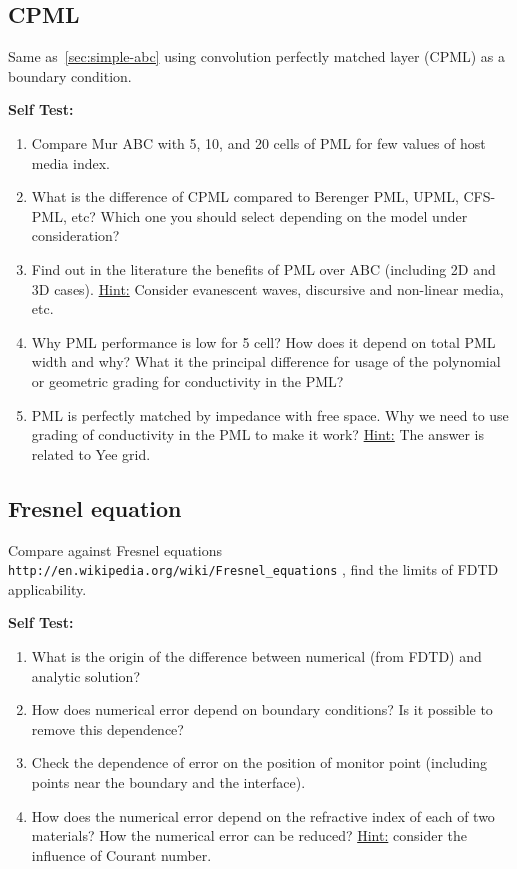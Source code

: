 \documentclass[11pt]{article}
\begin{document}
\subsection{CPML}
\label{sec:cpml}

Same as~\ref{sec:simple-abc} using convolution perfectly matched layer (CPML) as a boundary condition.

\textbf{Self Test:}
\begin{enumerate}
\item Compare Mur ABC with 5, 10, and 20 cells of PML for few values of host media index.
\item What is the difference of CPML compared to Berenger PML, UPML, CFS-PML, etc? Which one you should select depending on the model under consideration?
\item Find out in the literature the benefits of PML over ABC (including 2D and 3D cases). \underline{Hint:} Consider evanescent waves, discursive and non-linear media, etc.
\item Why PML performance is low for 5 cell? How does it depend on
  total PML width and why?  What it the principal difference for usage of the polynomial or geometric grading for conductivity in the PML?
\item PML is perfectly matched by impedance with free space. Why we
  need to use grading of conductivity in the PML to make it work?
  \underline{Hint:} The answer is related to Yee grid.
\end{enumerate}

\subsection{Fresnel equation}
\label{sec:fresnel-equation}
Compare against Fresnel equations
\verb+http://en.wikipedia.org/wiki/Fresnel_equations+ , find the limits of
FDTD applicability.

\textbf{Self Test:}
\begin{enumerate}
\item What is the origin of the difference between numerical (from
  FDTD) and analytic solution?
\item How does numerical error depend on boundary conditions? Is it
  possible to remove this dependence?
\item Check the dependence of error on the position of monitor point (including points near the boundary and the interface).
\item How does the numerical error depend on the refractive index of  each of two materials? How the numerical error can be reduced? \underline{Hint:} consider the influence of Courant number.
\end{enumerate}
\end{document}

